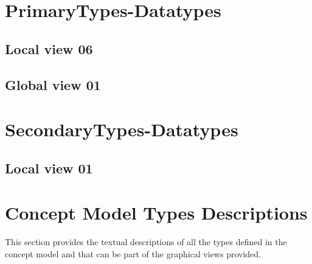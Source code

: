 \section{PrimaryTypes-Datatypes}
\subsection{Local view 06}
\label{sec:lu.uni.lassy.excalibur.examples.icrash-CM-view-local-PrimaryTypes-Datatypes-06}


\subsection{Global view 01}
\label{sec:lu.uni.lassy.excalibur.examples.icrash-CM-view-global-PrimaryTypes-Datatypes-01}





\section{SecondaryTypes-Datatypes}
\subsection{Local view 01}
\label{sec:lu.uni.lassy.excalibur.examples.icrash-CM-view-local-SecondaryTypes-Datatypes-01}






\section{Concept Model Types Descriptions}
This section provides the textual descriptions of all the types defined in the concept model and that can be part of the graphical views provided.












